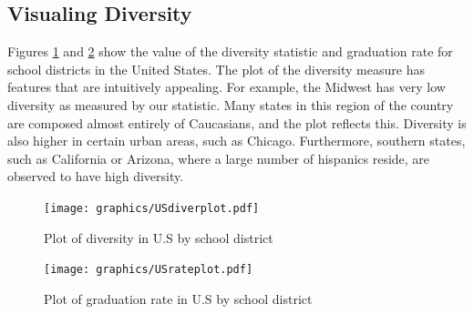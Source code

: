 \documentclass{article}
\begin{document}
\subsection{Visualing Diversity}
Figures \ref{diverplot} and \ref{rateplot} show the value of the diversity statistic and graduation rate for school districts in the United States.  The plot of the diversity measure has features that are intuitively appealing.  For example, the Midwest has very low diversity as measured by our statistic.  Many states in this region of the country are composed almost entirely of Caucasians, and the plot reflects this.  Diversity is also higher in certain urban areas, such as Chicago.  Furthermore, southern states, such as California or Arizona, where a large number of hispanics reside, are observed to have high diversity.


\begin{figure}[h]
 \begin{center}
 \vspace{-140pt}
  \texttt{[image: graphics/USdiverplot.pdf]}
 \vspace{-90pt}
 \end{center}
 \caption{Plot of diversity in U.S by school district \label{diverplot}}
\end{figure}


\begin{figure}[h]
 \begin{center}
 \vspace{-140pt}
  \texttt{[image: graphics/USrateplot.pdf]}
  \vspace{-90pt}
 \end{center}
 \caption{Plot of graduation rate in U.S by school district \label{rateplot}}
\end{figure}
 


\clearpage %


\end{document}
